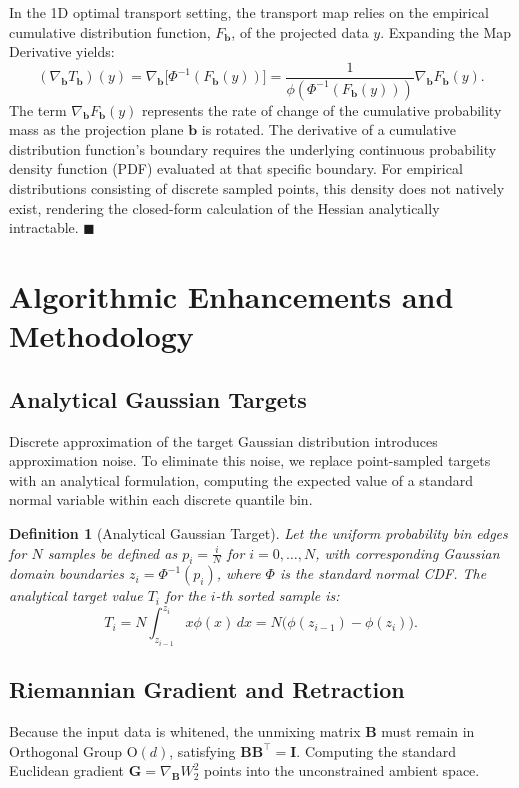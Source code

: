 \documentclass{tpm2026} %
\newtheorem{definition}{Definition}
\begin{document}
In the 1D optimal transport setting, the transport map relies on the empirical cumulative distribution function, $F_{\mathbf{b}}$, 
of the projected data $y$. Expanding the Map Derivative yields:
\begin{equation}
    (\nabla_{\mathbf{b}} T_{\mathbf{b}})(y) = \nabla_{\mathbf{b}} \big[ \Phi^{-1}(F_{\mathbf{b}}(y)) \big] = \frac{1}{\phi(\Phi^{-1}(F_{\mathbf{b}}(y)))} \nabla_{\mathbf{b}} F_{\mathbf{b}}(y).
\end{equation}
The term $\nabla_{\mathbf{b}} F_{\mathbf{b}}(y)$ represents the rate of change of the cumulative probability mass as the projection 
plane $\mathbf{b}$ is rotated. The derivative of a cumulative distribution function's boundary requires the underlying 
continuous probability density function (PDF) evaluated at that specific boundary. For empirical distributions consisting of discrete sampled points, 
this density does not natively exist, rendering the closed-form calculation of the Hessian analytically intractable. $\blacksquare$

\section{Algorithmic Enhancements and Methodology}
\label{app:methodology}

\subsection{Analytical Gaussian Targets}
Discrete approximation of the target Gaussian distribution introduces approximation noise. To eliminate this noise, 
we replace point-sampled targets with an analytical formulation, computing the expected value of a standard normal variable within each discrete quantile bin.

\begin{definition}[Analytical Gaussian Target]
Let the uniform probability bin edges for $N$ samples be defined as $p_i = \frac{i}{N}$ for $i = 0, \dots, N$, 
with corresponding Gaussian domain boundaries $z_i = \Phi^{-1}(p_i)$, where $\Phi$ is the standard normal CDF. The analytical target value $T_i$ for the $i$-th sorted sample is:
\begin{equation}
    T_i = N \int_{z_{i-1}}^{z_i} x \phi(x) \, dx = N \big( \phi(z_{i-1}) - \phi(z_i) \big).
\end{equation}
\end{definition}

\subsection{Riemannian Gradient and Retraction}
Because the input data is whitened, the unmixing matrix $\mathbf{B}$ must remain in Orthogonal Group $\mathrm{O}(d)$, satisfying $\mathbf{B}\mathbf{B}^\top = \mathbf{I}$. 
Computing the standard Euclidean gradient $\mathbf{G} = \nabla_{\mathbf{B}} W_2^2$ points into the unconstrained ambient space.
\end{document}
